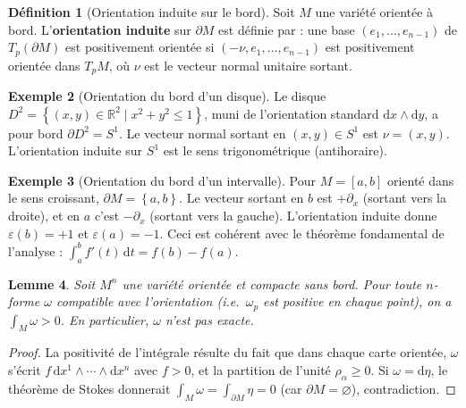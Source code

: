 \documentclass[12pt,a4paper,openany]{book}
\theoremstyle{definition}
\newtheorem{definition}{Définition}[chapter]
\newtheorem{exemple}[definition]{Exemple}
\theoremstyle{plain}
\newtheorem{lemme}[definition]{Lemme}
\theoremstyle{remark}
\newcommand{\R}{\mathbb{R}}
\newcommand{\dd}{\mathrm{d}}
\newcommand{\set}[1]{\left\{#1\right\}}
\begin{document}
\begin{definition}[Orientation induite sur le bord]\label{def:orientation-bord}%
Soit $M$ une variété orientée à bord. L'\textbf{orientation induite} sur
$\partial M$ est définie par : une base
$(e_1, \ldots, e_{n-1})$ de $T_p(\partial M)$ est positivement orientée
si $(-\nu, e_1, \ldots, e_{n-1})$ est positivement orientée dans
$T_p M$, où $\nu$ est le vecteur normal unitaire sortant.
\end{definition}

\begin{exemple}[Orientation du bord d'un disque]\label{ex:orientation-bord-disque}
Le disque $D^2 = \set{(x,y) \in \R^2 \mid x^2 + y^2 \leq 1}$, muni de
l'orientation standard $\dd x \wedge \dd y$, a pour bord $\partial D^2 = S^1$.
Le vecteur normal sortant en $(x,y) \in S^1$ est $\nu = (x,y)$. L'orientation
induite sur $S^1$ est le sens trigonométrique (antihoraire).
\end{exemple}

\begin{exemple}[Orientation du bord d'un intervalle]\label{ex:orientation-bord-intervalle}
Pour $M = [a,b]$ orienté dans le sens croissant, $\partial M = \set{a, b}$.
Le vecteur sortant en $b$ est $+\partial_x$ (sortant vers la droite), et
en $a$ c'est $-\partial_x$ (sortant vers la gauche). L'orientation
induite donne $\varepsilon(b) = +1$ et $\varepsilon(a) = -1$. Ceci est
cohérent avec le théorème fondamental de l'analyse :
$\int_a^b f'(t)\,\dd t = f(b) - f(a)$.
\end{exemple}

\begin{lemme}\label{lem:forme-volume-orientation}%
Soit $M^n$ une variété orientée et compacte sans bord. Pour toute
$n$-forme $\omega$ compatible avec l'orientation (i.e.\
$\omega_p$ est positive en chaque point), on a $\int_M \omega > 0$.
En particulier, $\omega$ n'est pas exacte.
\end{lemme}

\begin{proof}
La positivité de l'intégrale résulte du fait que dans chaque carte orientée,
$\omega$ s'écrit $f\,\dd x^1 \wedge \cdots \wedge \dd x^n$ avec $f > 0$,
et la partition de l'unité $\rho_\alpha \geq 0$. Si $\omega = \dd\eta$,
le théorème de Stokes donnerait $\int_M \omega = \int_{\partial M} \eta = 0$
(car $\partial M = \varnothing$), contradiction.
\end{proof}

\end{document}
